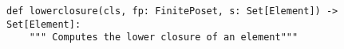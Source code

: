 \begin{verbatim}
def lowerclosure(cls, fp: FinitePoset, s: Set[Element]) -> Set[Element]:
    """ Computes the lower closure of an element"""
\end{verbatim}